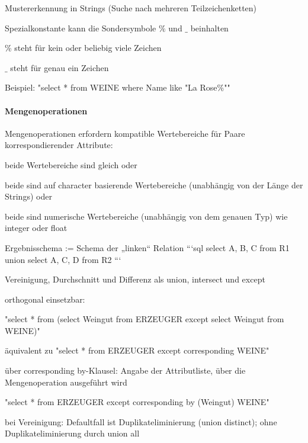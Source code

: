 \documentclass[a4paper]{article}
\begin{document}
\begin{multicols}{3}
\begin{itemize*}
\begin{itemize*}
        \item Mustererkennung in Strings (Suche nach mehreren Teilzeichenketten)
        \item Spezialkonstante kann die Sondersymbole $\%$ und $\_$ beinhalten
        \begin{itemize*}
            \item \% steht für kein oder beliebig viele Zeichen
            \item $\_$ steht für genau ein Zeichen
        \end{itemize*}
        \item Beispiel: "select * from WEINE where Name like "La Rose\%""
    \end{itemize*}
\end{itemize*}

\paragraph{Mengenoperationen}
Mengenoperationen erfordern kompatible Wertebereiche für Paare korrespondierender Attribute:
\begin{itemize*}
    \item beide Wertebereiche sind gleich oder
    \item beide sind auf character basierende Wertebereiche (unabhängig von der Länge der Strings) oder
    \item beide sind numerische Wertebereiche (unabhängig von dem genauen Typ) wie integer oder float
    \item Ergebnisschema := Schema der „linken“ Relation
    ```sql
    select A, B, C from R1
    union
    select A, C, D from R2
    ```
\end{itemize*}

\begin{itemize*}
    \item Vereinigung, Durchschnitt und Differenz als union, intersect und except
    \item orthogonal einsetzbar:
    \item "select * from (select Weingut from ERZEUGER except select Weingut from WEINE)"
    \item äquivalent zu "select * from ERZEUGER except corresponding WEINE"
    \item über corresponding by-Klausel: Angabe der Attributliste, über die Mengenoperation ausgeführt wird
    \item "select * from ERZEUGER except corresponding by (Weingut) WEINE"
    \item bei Vereinigung: Defaultfall ist Duplikateliminierung (union distinct); ohne Duplikateliminierung durch union all
\end{itemize*}


\end{multicols}
\end{document}
